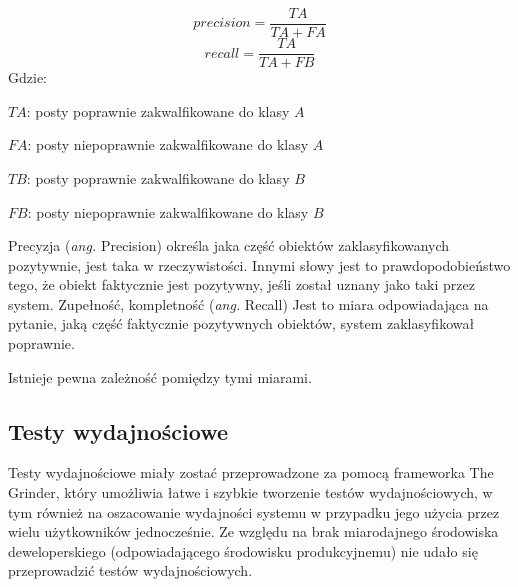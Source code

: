 \documentclass[runningheads]{llncs}
\begin{document}
\begin{equation}
	precision = \frac{TA}{TA + FA}
\end{equation}
\begin{equation}
	recall = \frac{TA}{TA + FB}
\end{equation}
Gdzie: 

	$TA$: posty poprawnie zakwalfikowane do klasy $A$
	
	$FA$: posty niepoprawnie zakwalfikowane do klasy $A$
	
	$TB$: posty poprawnie zakwalfikowane do klasy $B$
	
	$FB$: posty niepoprawnie zakwalfikowane do klasy $B$
	
Precyzja (\textit{ang.} Precision)  określa jaka część obiektów
zaklasyfikowanych pozytywnie, jest taka  w rzeczywistości. Innymi słowy jest to
prawdopodobieństwo tego, że obiekt faktycznie jest  pozytywny, jeśli został
uznany jako taki przez system.
Zupełność, kompletność (\textit{ang.} Recall) Jest to miara odpowiadająca na
pytanie, jaką część faktycznie pozytywnych obiektów, system zaklasyfikował poprawnie.

Istnieje pewna zależność pomiędzy tymi miarami. 
 

\subsection{Testy wydajnościowe}
Testy wydajnościowe miały zostać przeprowadzone  za pomocą frameworka The
Grinder, który 
umożliwia łatwe i szybkie  tworzenie  testów wydajnościowych, w tym również
na oszacowanie wydajności systemu w przypadku  jego użycia przez wielu
użytkowników jednocześnie. Ze względu na brak miarodajnego środowiska
deweloperskiego (odpowiadającego środowisku produkcyjnemu) nie udało się
przeprowadzić testów wydajnościowych.

\clearpage
 
\end{document}
